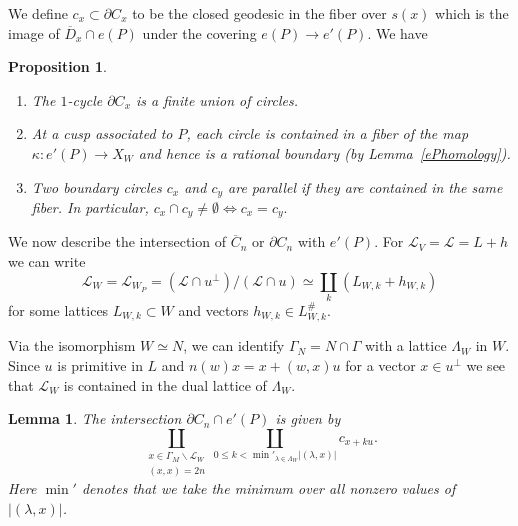 \documentclass[12pt,leqno]{amsart}
\numberwithin{equation}{section}
\theoremstyle{plain}
\newtheorem{lemma}[theorem]{Lemma}
\newtheorem{proposition}[theorem]{Proposition}
\theoremstyle{definition}
\theoremstyle{remark}
\newcommand{\G}{\Gamma}
\newcommand{\la}{\lambda}
\newcommand{\back}{\backslash}
\newcommand{\calL}{\mathcal{L}}
\begin{document}
We define $c_x \subset \partial C_x$ to be the closed geodesic in the fiber over $s(x)$ which is the image of $\overline{D}_x \cap e(P)$ under the covering $e(P) \to e'(P)$. We have

\begin{proposition}\label{TnBS}
\begin{enumerate}
\item[(i)] The $1$-cycle $\partial C_x$ is a finite union of circles. 
\item[(ii)] At a cusp associated to $P$, each circle is contained in a fiber of the map $\kappa: e'(P) \to X_W$ and hence is a rational boundary (by Lemma~\ref{ePhomology}). 
\item[(iii)] Two boundary circles $c_x$ and $c_y$ are parallel if they are contained in the same fiber. In particular, 
$
c_x \cap c_y \neq \emptyset \iff c_x= c_y.
$
\end{enumerate}
\end{proposition}

We now describe the intersection of $\overline{C}_n$ or $\partial C_n$ with $e'(P)$. For $\calL_V=\calL = L +h$ we can write
\begin{equation*}
{\calL}_W= {\calL}_{W_P}= (\calL \cap u^{\perp}) / (\calL \cap u) \simeq \coprod_k \left(L_{W,k} +
h_{W,k}\right)
\end{equation*}
for some lattices $L_{W,k} \subset W$ and vectors $h_{W,k} \in L^{\#}_{W,k}$.

Via the isomorphism $W \simeq N$, we can identify $\G_N = N \cap \G$ with a lattice $\Lambda_W$ in $W$. Since  $u$ is primitive in $L $ and $n(w) x= x + (w,x)u$ for a vector $x \in u^{\perp}$ we see that ${\calL}_W$ is contained in the dual lattice of $\Lambda_W$. 

\begin{lemma}\label{LemmaB}
The intersection $\partial C_n \cap e'(P)$ is given by 
\[
 \coprod_{ \substack{x\in \G_M \back \mathcal{L}_W \\ (x,x)=2n}} \coprod_{0 \leq k < \min'_{\la \in \Lambda_W}   |(\la,x)|} c_{x+ku}.
 \] 
Here $\min'$ denotes that we take the minimum over all nonzero values of $ |(\la,x)|$.
\end{lemma}
\end{document}
